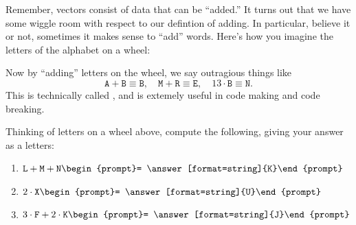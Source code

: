 \documentclass{ximera}
\begin{document}
Remember, vectors consist of data that can be ``added.'' It turns out
that we have some wiggle room with respect to our defintion of
adding. In particular, believe it or not, sometimes it makes sense to
``add'' words. Here's how you imagine the letters of the alphabet on a
wheel:
\begin{center}
\end{center}
Now by ``adding'' letters on the wheel, we say outragious things like
\[
\texttt{A}+ \texttt{B} \equiv \texttt{B}, \quad \texttt{M}+\texttt{R} \equiv \texttt{E}, \quad 13\cdot \texttt{B} \equiv \texttt{N}.
\]
This is technically called , and
is extemely useful in code making and code breaking.

\begin{question}
  Thinking of letters on a wheel above, compute the following, giving your answer as a letters:
  \begin{enumerate}
    \item $\texttt{L} + \texttt{M} + \texttt{N} \begin{prompt}= \answer[format=string]{K}\end{prompt}$
    \item $2\cdot \texttt{X} \begin{prompt}= \answer[format=string]{U}\end{prompt}$
    \item $3\cdot \texttt{F} + 2\cdot\texttt{K} \begin{prompt}= \answer[format=string]{J}\end{prompt}$
    \pdfOnly{\end{multicols}}
  \end{enumerate}
\end{question}
\end{document}
